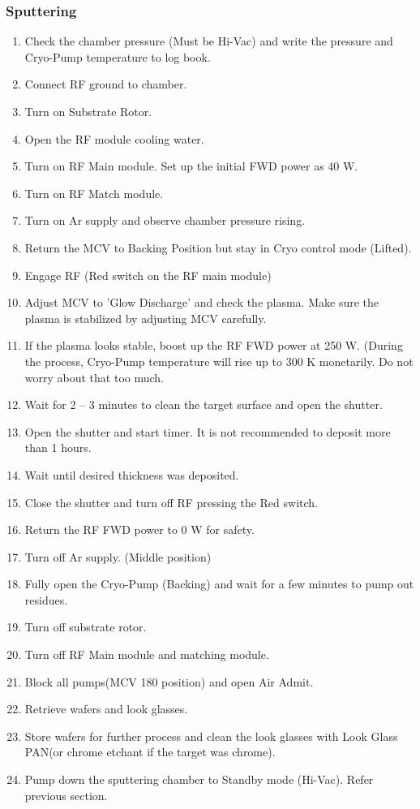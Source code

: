 \subsubsection{Sputtering}
\begin{enumerate}
\item Check the chamber pressure (Must be Hi-Vac) and write the pressure and Cryo-Pump temperature to log book.
\item Connect RF ground to chamber.
\item Turn on Substrate Rotor.
\item Open the RF module cooling water.
\item Turn on RF Main module. Set up the initial FWD power as 40 W.
\item Turn on RF Match module.
\item Turn on Ar supply and observe chamber pressure rising.
\item Return the MCV to Backing Position but stay in Cryo control mode (Lifted).
\item Engage RF (Red switch on the RF main module)
\item Adjust MCV to 'Glow Discharge' and check the plasma. Make sure the plasma is stabilized by adjusting MCV carefully.
\item If the plasma looks stable, boost up the RF FWD power at 250 W. (During the process, Cryo-Pump temperature will rise up to 300 K monetarily. Do not worry about that too much.
\item Wait for 2 -- 3 minutes to clean the target surface and open the shutter.
\item Open the shutter and start timer. It is not recommended to deposit more than 1 hours.   
\item Wait until desired thickness was deposited.
\item Close the shutter and turn off RF pressing the Red switch.
\item Return the RF FWD power to 0 W for safety.
\item Turn off Ar supply. (Middle position)
\item Fully open the Cryo-Pump (Backing) and wait for a few minutes to pump out residues. 
\item Turn off substrate rotor.
\item Turn off RF Main module and matching module.
\item Block all pumps(MCV 180 position) and open Air Admit.
\item Retrieve wafers and look glasses.
\item Store wafers for further process and clean the look glasses with Look Glass PAN(or chrome etchant if the target was chrome).
\item Pump down the sputtering chamber to Standby mode (Hi-Vac). Refer previous section.
\end{enumerate}

